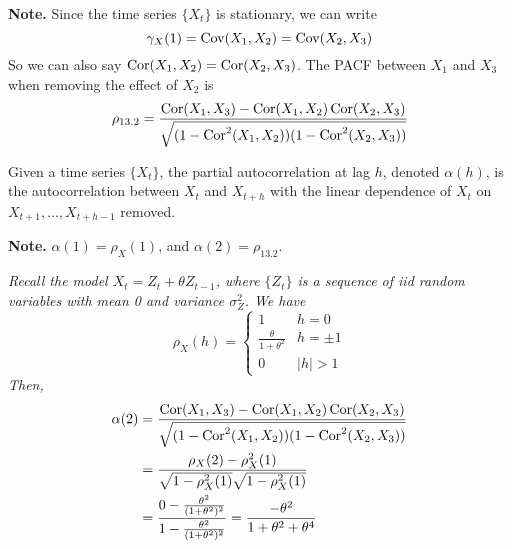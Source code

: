 \textbf{Note.} Since the time series $\{X_t\}$ is stationary, we can write
\[\gamma_X(1) = \operatorname{Cov}(X_1, X_2) = \operatorname{Cov}(X_2,X_3)\]
So we can also say $\operatorname{Cor}(X_1,X_2) = \operatorname{Cor}(X_2,X_3)$. The PACF between $X_1$ and $X_3$ when removing the effect of $X_2$ is
\[\rho_{13.2} = \frac{\operatorname{Cor}(X_1,X_3) - \operatorname{Cor}(X_1,X_2)\operatorname{Cor}(X_2,X_3)}{\sqrt{(1-\operatorname{Cor}^2(X_1,X_2))(1-\operatorname{Cor}^2(X_2,X_3))}}\]
\begin{definition}
    Given a time series $\{X_t\}$, the partial autocorrelation at lag $h$, denoted $\alpha(h)$, is the autocorrelation between $X_t$ and $X_{t+h}$ with the linear dependence of $X_t$ on $X_{t+1},\ldots,X_{t+h-1}$ removed.
\end{definition}
\noindent
\textbf{Note.} $\alpha(1) = \rho_X(1)$, and $\alpha(2) = \rho_{13.2}$.

\begin{example}[MA(1)]
    \emph{
        Recall the model $X_t = Z_t + \theta Z_{t-1}$, where $\{Z_t\}$ is a sequence of iid random variables with mean 0 and variance $\sigma_Z^2$. We have
        \[\rho_X(h) = \begin{cases}
            1 & h = 0\\
            \frac{\theta}{1+\theta^2} & h = \pm 1\\
            0 & |h| > 1
        \end{cases}\]
        Then, 
        \begin{align*}
            \alpha(2) &= \frac{\operatorname{Cor}(X_1,X_3) - \operatorname{Cor}(X_1,X_2)\operatorname{Cor}(X_2,X_3)}{\sqrt{(1-\operatorname{Cor}^2(X_1,X_2))(1-\operatorname{Cor}^2(X_2,X_3))}}\\
            &= \frac{\rho_X(2) - \rho^2_X(1)}{\sqrt{1-\rho_X^2(1)}\sqrt{1-\rho_X^2(1)}}\\
            &= \frac{0 - \frac{\theta^2}{(1+\theta^2)^2}}{1 - \frac{\theta^2}{(1+\theta^2)^2}} = \frac{-\theta^2}{1+\theta^2+\theta^4}\\
        \end{align*}
        }
\end{example}
